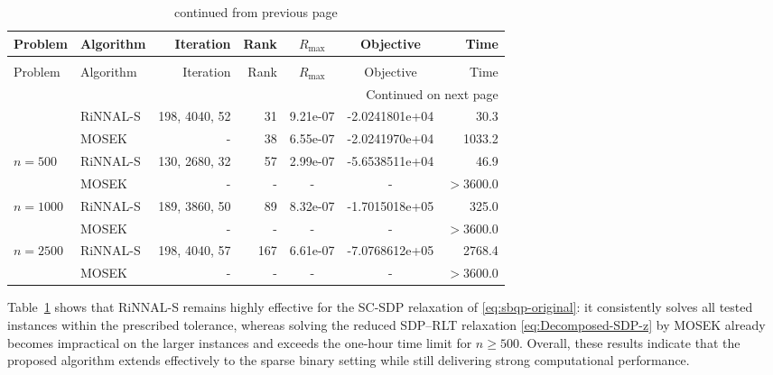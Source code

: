 \documentclass[11pt]{article}
\theoremstyle{plain}
\begin{document}
\small
\begin{longtable}{llrrccr}
\caption{Computational results for the SC-SDP relaxation of \eqref{eq:sbqp-original}.}
\label{tab:uqp-orlib-results}\\
\toprule
Problem & Algorithm & Iteration & Rank & $R_{\max}$ & Objective & Time \\
\midrule
\endfirsthead
\caption[]{continued from previous page}\\
\toprule
Problem & Algorithm & Iteration & Rank & $R_{\max}$ & Objective & Time \\
\midrule
\endhead
\midrule
\multicolumn{7}{r}{Continued on next page}\\
\endfoot
\bottomrule
\endlastfoot
\multirow{2}{*}{$n = 250$}  & RiNNAL-S & 198, 4040, 52 & 31 & 9.21e-07 & -2.0241801e+04 & 30.3 \\*
                              & MOSEK   & -             & 38 & 6.55e-07 & -2.0241970e+04 & 1033.2 \\
\midrule
\multirow{2}{*}{$n = 500$}  & RiNNAL-S & 130, 2680, 32 & 57 & 2.99e-07 & -5.6538511e+04 & 46.9 \\*
                              & MOSEK   & -             & -  & -        & -               & $>3600.0$ \\
\midrule
\multirow{2}{*}{$n = 1000$} & RiNNAL-S & 189, 3860, 50 & 89 & 8.32e-07 & -1.7015018e+05 & 325.0 \\*
                              & MOSEK   & -             & -  & -        & -               & $>3600.0$ \\
\midrule
\multirow{2}{*}{$n = 2500$} & RiNNAL-S & 198, 4040, 57 & 167 & 6.61e-07 & -7.0768612e+05 & 2768.4 \\*
                              & MOSEK   & -             & -  & -        & -               & $>3600.0$ \\
\end{longtable}
\normalsize

Table~\ref{tab:uqp-orlib-results} shows that RiNNAL-S remains highly effective for the SC-SDP relaxation of \eqref{eq:sbqp-original}: it consistently solves all tested instances within the prescribed tolerance, whereas solving the reduced SDP--RLT relaxation \eqref{eq:Decomposed-SDP-z} by MOSEK
already becomes impractical on the larger instances and exceeds the one-hour time limit for $n\geq 500$. Overall, these results indicate that the proposed algorithm extends effectively to the sparse binary setting while still delivering strong computational performance.
\end{document}
